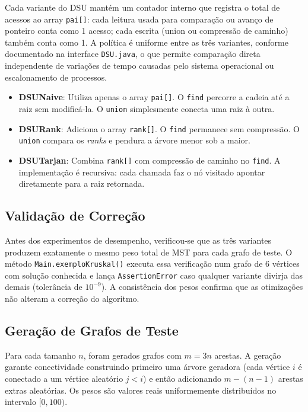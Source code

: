 \documentclass[12pt]{article}
\begin{document}
Cada variante do DSU mantém um contador interno que registra o total de acessos ao array \texttt{pai[]}: cada leitura usada para comparação ou avanço de ponteiro conta como 1 acesso; cada escrita (union ou compressão de caminho) também conta como 1. A política é uniforme entre as três variantes, conforme documentado na interface \texttt{DSU.java}, o que permite comparação direta independente de variações de tempo causadas pelo sistema operacional ou escalonamento de processos.

\begin{itemize}
  \item \textbf{DSUNaive}: Utiliza apenas o array \texttt{pai[]}. O \texttt{find} percorre a cadeia até a raiz sem modificá-la. O \texttt{union} simplesmente conecta uma raiz à outra.

  \item \textbf{DSURank}: Adiciona o array \texttt{rank[]}. O \texttt{find} permanece sem compressão. O \texttt{union} compara os \textit{ranks} e pendura a árvore menor sob a maior.

  \item \textbf{DSUTarjan}: Combina \texttt{rank[]} com compressão de caminho no \texttt{find}. A implementação é recursiva: cada chamada faz o nó visitado apontar diretamente para a raiz retornada.
\end{itemize}

\subsection{Validação de Correção}

Antes dos experimentos de desempenho, verificou-se que as três variantes produzem exatamente o mesmo peso total de MST para cada grafo de teste. O método \texttt{Main.exemploKruskal()} executa essa verificação num grafo de 6 vértices com solução conhecida e lança \texttt{AssertionError} caso qualquer variante divirja das demais (tolerância de $10^{-9}$). A consistência dos pesos confirma que as otimizações não alteram a correção do algoritmo.

\subsection{Geração de Grafos de Teste}

Para cada tamanho $n$, foram gerados grafos com $m = 3n$ arestas. A geração garante conectividade construindo primeiro uma árvore geradora (cada vértice $i$ é conectado a um vértice aleatório $j < i$) e então adicionando $m - (n-1)$ arestas extras aleatórias. Os pesos são valores reais uniformemente distribuídos no intervalo $[0, 100)$.
\end{document}
